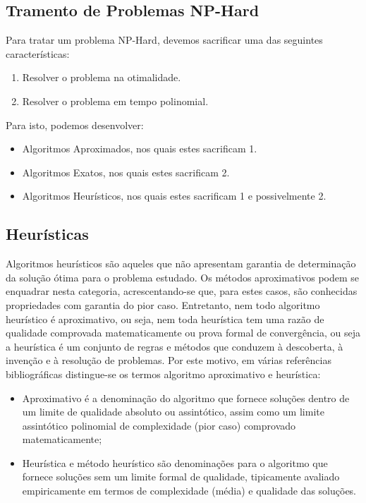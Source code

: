 \documentclass[a4paper, 12pt]{article}
\begin{document}

\subsection{Tramento de Problemas NP-Hard}

Para tratar um problema NP-Hard, devemos sacrificar uma das seguintes características:
\begin{enumerate}
    \item Resolver o problema na otimalidade.
    \item Resolver o problema em tempo polinomial.
\end{enumerate}
Para isto, podemos desenvolver:
\begin{itemize}
    \item Algoritmos Aproximados, nos quais estes sacrificam 1.
    \item Algoritmos Exatos, nos quais estes sacrificam 2.
    \item Algoritmos Heurísticos, nos quais estes sacrificam 1 e possivelmente 2.
\end{itemize}

\subsection{Heurísticas}

Algoritmos heurísticos são aqueles que não apresentam garantia de determinação da solução ótima para o 
problema estudado. Os métodos aproximativos podem se enquadrar nesta categoria, acrescentando-se que, para 
estes casos, são conhecidas propriedades com garantia do pior caso.  Entretanto, nem todo algoritmo heurístico 
é aproximativo, ou seja, nem toda heurística tem uma razão de qualidade comprovada matematicamente ou prova 
formal de convergência, ou seja a heurística é um conjunto de regras e métodos que conduzem à descoberta, à 
invenção e à resolução de problemas. Por este motivo, em várias referências bibliográficas distingue-se os 
termos algoritmo aproximativo e heurística:
\begin{itemize}
    \item Aproximativo é a denominação do algoritmo que fornece soluções dentro de um limite de qualidade absoluto ou assintótico, assim como um limite assintótico polinomial de complexidade (pior caso) comprovado matematicamente;
    \item Heurística e método heurístico são denominações para o algoritmo que fornece soluções sem um limite formal de qualidade, tipicamente avaliado empiricamente em termos de complexidade (média) e qualidade das soluções.
\end{itemize}
\end{document}
